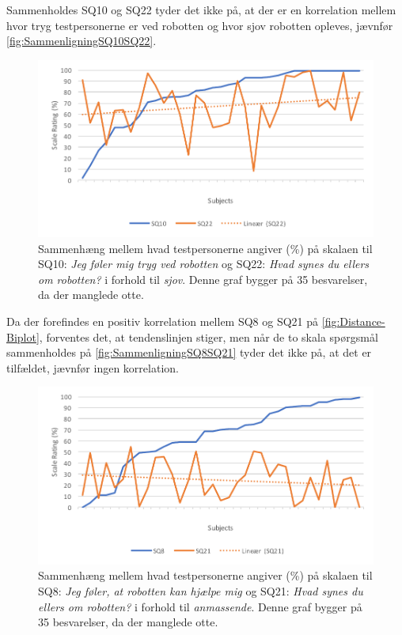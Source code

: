 Sammenholdes SQ10 og SQ22 tyder det ikke på, at der er en korrelation mellem hvor tryg testpersonerne er ved robotten og hvor sjov robotten opleves, jævnfør \autoref{fig:SammenligningSQ10SQ22}. 
%
\begin{figure}[H]
	\centering
	\includegraphics[width=\textwidth]{Figure/Korrelationsgrafer/SQ10+SQ22}
	\caption{Sammenhæng mellem hvad testpersonerne angiver (\%) på skalaen til SQ10: \textit{Jeg føler mig tryg ved robotten} og SQ22: \textit{Hvad synes du ellers om robotten?} i forhold til \textit{sjov}. Denne graf bygger på 35 besvarelser, da der manglede otte.}
	\label{fig:SammenligningSQ10SQ22}
\end{figure}
\noindent
%
Da der forefindes en positiv korrelation mellem SQ8 og SQ21 på \autoref{fig:Distance-Biplot}, forventes det, at tendenslinjen stiger, men når de to skala spørgsmål sammenholdes på \autoref{fig:SammenligningSQ8SQ21} tyder det ikke på, at det er tilfældet, jævnfør ingen korrelation.
\newpage  
%
\begin{figure}[H]
	\centering
	\includegraphics[width=\textwidth]{Figure/Korrelationsgrafer/SQ8+SQ21}
	\caption{Sammenhæng mellem hvad testpersonerne angiver (\%) på skalaen til SQ8: \textit{Jeg føler, at robotten kan hjælpe mig} og SQ21: \textit{Hvad synes du ellers om robotten?} i forhold til \textit{anmassende}. Denne graf bygger på 35 besvarelser, da der manglede otte.}
	\label{fig:SammenligningSQ8SQ21}
\end{figure}
